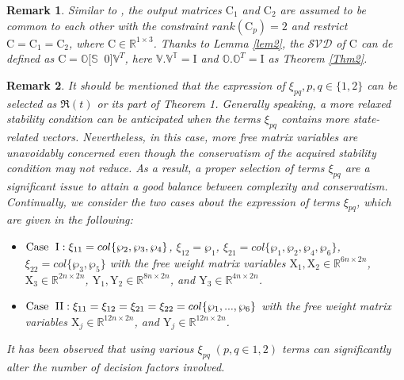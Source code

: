 \documentclass[preprint,11pt]{elsarticle}
\newtheorem{remark}{Remark}
\begin{document}
\begin{remark}
Similar to \cite{sub1}, the output matrices $\mathrm{C}_1$ and $\mathrm{C}_2$ are assumed to be common to each other with the constraint $rank(\mathrm{C}_p)=2$ and restrict $\mathrm{C}=\mathrm{C}_1=\mathrm{C}_2$, where $\mathrm{C}\in \mathbb{R}^{1\times 3}$. Thanks to Lemma \ref{lem2}, the $\mathcal{\mathcal{SVD}}$ of $\mathrm{C}$ can de defined as $\mathrm{C}=\mathbb{O}\big[ \mathbb{S}\;\;0 \big]\mathbb{V}^T$, here $\mathbb{V.V^T}=\mathrm{I}$ and $\mathbb{O.O}^T=\mathrm{I}$ as Theorem \ref{Thm2}.
\end{remark}
\vspace{-0.6cm}
\begin{remark}
It should be mentioned that the expression of $\xi_{pq},p,q\in\{1,2\}$ can be selected as $\Re(t)$ or its part of Theorem 1. Generally speaking, a more relaxed stability condition can be anticipated when the terms $\xi_{pq}$ contains more state-related vectors. Nevertheless, in this case, more free matrix variables are unavoidably concerned even though the conservatism of the acquired stability condition may not reduce. As a result, a proper selection of terms $\xi_{pq}$ are a significant issue to attain a good balance between complexity and conservatism. Continually, we consider the two cases about the expression of terms $\xi_{pq}$, which are given in the following:
\begin{itemize}
 \item $\mbox{Case \;I}:\xi_{11}=col\{\wp_2,\wp_3,\wp_4\}$, $\xi_{12}=\wp_1$, $\xi_{21}=col\{\wp_1,\wp_2,\wp_4,\wp_6\}$, $\xi_{22}=col\{\wp_3,\wp_5\}$ with the free weight matrix variables $\mathrm{X}_1,\mathrm{X}_2\in \mathbb{R}^{6n \times 2n}$, $\mathrm{X}_3\in \mathbb{R}^{2n \times 2n}$, $\mathrm{Y}_1,\mathrm{Y}_2\in \mathbb{R}^{8n \times 2n}$, and $\mathrm{Y}_3\in \mathbb{R}^{4n \times 2n}$.
 \item $\mbox{Case \;II}:\xi_{11}=\xi_{12}=\xi_{21}=\xi_{22}=col\{\wp_1,...,\wp_6\}$ with the free weight matrix variables $\mathrm{X}_j\in \mathbb{R}^{12n \times 2n}$, and $\mathrm{Y}_j\in \mathbb{R}^{12n \times 2n}$.
 \end{itemize}
It has been observed that using various $\xi_{pq}\;(p,q\in{1,2})$ terms can significantly alter the number of decision factors involved.
\end{remark}
\vspace{-0.8cm}
\end{document}
